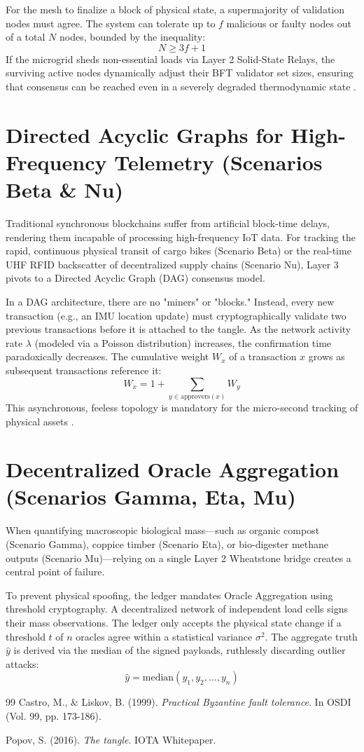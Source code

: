 For the mesh to finalize a block of physical state, a supermajority of validation nodes must agree. The system can tolerate up to $f$ malicious or faulty nodes out of a total $N$ nodes, bounded by the inequality:
\begin{equation}
N \ge 3f + 1
\end{equation}
If the microgrid sheds non-essential loads via Layer 2 Solid-State Relays, the surviving active nodes dynamically adjust their BFT validator set sizes, ensuring that consensus can be reached even in a severely degraded thermodynamic state \cite{castro1999practical}.

\section{Directed Acyclic Graphs for High-Frequency Telemetry (Scenarios Beta \& Nu)}
Traditional synchronous blockchains suffer from artificial block-time delays, rendering them incapable of processing high-frequency IoT data. For tracking the rapid, continuous physical transit of cargo bikes (Scenario Beta) or the real-time UHF RFID backscatter of decentralized supply chains (Scenario Nu), Layer 3 pivots to a Directed Acyclic Graph (DAG) consensus model.

In a DAG architecture, there are no "miners" or "blocks." Instead, every new transaction (e.g., an IMU location update) must cryptographically validate two previous transactions before it is attached to the tangle. As the network activity rate $\lambda$ (modeled via a Poisson distribution) increases, the confirmation time paradoxically decreases. The cumulative weight $W_x$ of a transaction $x$ grows as subsequent transactions reference it:
\begin{equation}
W_x = 1 + \sum_{y \in \text{approvers}(x)} W_y
\end{equation}
This asynchronous, feeless topology is mandatory for the micro-second tracking of physical assets \cite{popov2016tangle}.

\section{Decentralized Oracle Aggregation (Scenarios Gamma, Eta, Mu)}
When quantifying macroscopic biological mass—such as organic compost (Scenario Gamma), coppice timber (Scenario Eta), or bio-digester methane outputs (Scenario Mu)—relying on a single Layer 2 Wheatstone bridge creates a central point of failure. 

To prevent physical spoofing, the ledger mandates Oracle Aggregation using threshold cryptography. A decentralized network of independent load cells signs their mass observations. The ledger only accepts the physical state change if a threshold $t$ of $n$ oracles agree within a statistical variance $\sigma^2$. The aggregate truth $\hat{y}$ is derived via the median of the signed payloads, ruthlessly discarding outlier attacks:
\begin{equation}
\hat{y} = \text{median}(y_1, y_2, \dots, y_n)
\end{equation}

\vspace{1cm}
\begin{thebibliography}{99}
Castro, M., \& Liskov, B. (1999). \textit{Practical Byzantine fault tolerance}. In OSDI (Vol. 99, pp. 173-186).

Popov, S. (2016). \textit{The tangle}. IOTA Whitepaper.
\end{thebibliography}
